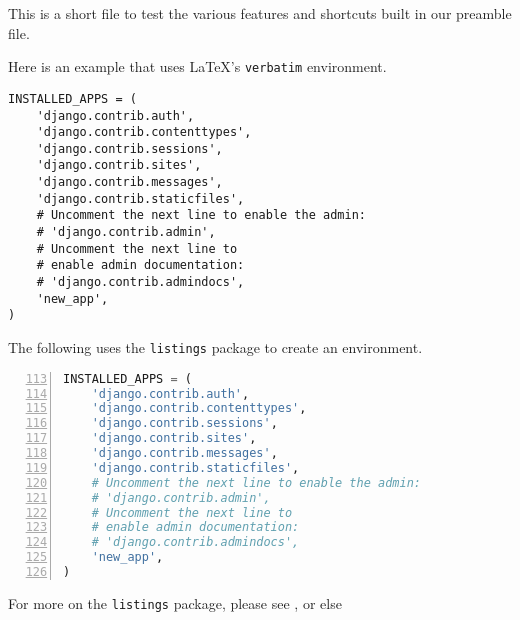 





This is a short file to test the various features and shortcuts built in our preamble file.


Here is an example that uses \LaTeX 's \verb|verbatim| environment.
\begin{verbatim}
INSTALLED_APPS = (
    'django.contrib.auth',
    'django.contrib.contenttypes',
    'django.contrib.sessions',
    'django.contrib.sites',
    'django.contrib.messages',
    'django.contrib.staticfiles',
    # Uncomment the next line to enable the admin:
    # 'django.contrib.admin',
    # Uncomment the next line to
    # enable admin documentation:
    # 'django.contrib.admindocs',
    'new_app',
)
\end{verbatim}

The following uses the \verb|listings| package to create an environment.

\begin{lstlisting}[basicstyle=\ttfamily,%
                   caption={Django's Installed Apps in settings.py},%
                   columns=fixed,%
                   frame=single,%
                   firstnumber=113,%
                   label=code:django:installed_apps,%
                   language=Python,%
                   numbers=left]
INSTALLED_APPS = (
    'django.contrib.auth',
    'django.contrib.contenttypes',
    'django.contrib.sessions',
    'django.contrib.sites',
    'django.contrib.messages',
    'django.contrib.staticfiles',
    # Uncomment the next line to enable the admin:
    # 'django.contrib.admin',
    # Uncomment the next line to
    # enable admin documentation:
    # 'django.contrib.admindocs',
    'new_app',
)
\end{lstlisting}

For more on the \verb|listings| package, please see , or else 


